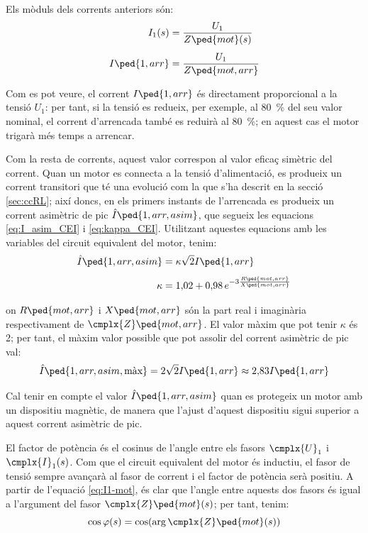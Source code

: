 Els mòduls dels corrents anteriors són:
\begin{subequations}
\begin{align}
    I_1(s) &= \frac{U_1}{Z\ped{mot}(s)} \label{eq:mot-I1}\\[1ex]
    I\ped{1,arr} &= \frac{U_1}{Z\ped{mot,arr}}\label{eq:mot-Iarr}
\end{align}
\end{subequations}

Com es pot veure, el corrent $I\ped{1,arr}$ és directament proporcional a la tensió $U_1$:  per tant, si la tensió es redueix, per exemple, al \qty{80}{\%} del seu valor nominal, el corrent d'arrencada també es reduirà al \qty{80}{\%}; en aquest cas el motor trigarà més temps a arrencar.

Com la resta de corrents, aquest valor correspon al valor eficaç simètric del corrent. Quan un motor es connecta a la tensió d'alimentació, es produeix un corrent transitori que té una evolució com la que s'ha descrit en la secció \vref{sec:ccRL}; així doncs, en els primers instants de l'arrencada es produeix un corrent asimètric de pic $\hat{I}\ped{1,arr,asim}$, que segueix les equacions \eqref{eq:I_asim_CEI} i \eqref{eq:kappa_CEI}. Utilitzant aquestes equacions amb les variables del circuit equivalent del motor, tenim:
\begin{subequations}
\begin{align}
    \hat{I}\ped{1,arr,asim} &= \kappa \sqrt{2} I\ped{1,arr}  \\[1ex]
    \kappa &= 1{,}02 + 0{,}98 \,e^{-3\frac{R\ped{mot,arr}}{X\ped{mot,arr}}}
\end{align}
\end{subequations}

on $R\ped{mot,arr}$ i $X\ped{mot,arr}$ són la part real i imaginària respectivament de $\cmplx{Z}\ped{mot,arr}$. El valor màxim que pot tenir  $\kappa$ és 2;  per tant, el màxim valor possible que pot assolir del corrent asimètric de pic val:
\begin{equation}
	\hat{I}\ped{1,arr,asim,\text{màx}} =  2\sqrt{2} I\ped{1,arr} \approx 2{,}83 I\ped{1,arr} 
\end{equation}

Cal tenir en compte el valor $\hat{I}\ped{1,arr,asim}$ quan es protegeix un motor amb un dispositiu magnètic, de manera que l'ajust d'aquest dispositiu sigui superior a aquest corrent asimètric de  pic.

El factor de potència és el cosinus de l'angle entre els fasors $\cmplx{U}_1$ i $\cmplx{I}_1(s)$. Com que el circuit equivalent del motor és inductiu, el fasor de tensió sempre avançarà al fasor de corrent i el factor de potència serà positiu. A partir de l'equació \eqref{eq:I1-mot}, és clar que l'angle entre aquests dos fasors és igual a l'argument del fasor $\cmplx{Z}\ped{mot}(s)$; per tant, tenim:
\begin{equation}\index{motors d'inducció!factor de potència}
	\cos\varphi(s) = \cos(\arg\cmplx{Z}\ped{mot}(s))\label{eq:cos-fi-mot}
\end{equation}

